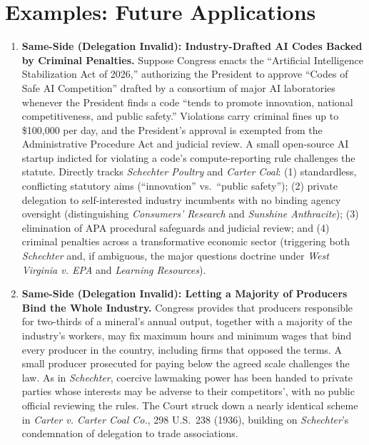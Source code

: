 \documentclass[12pt]{article}
\begin{document}
\section{Examples: Future Applications}
\begin{enumerate}

\item \textbf{Same-Side (Delegation Invalid): Industry-Drafted AI Codes Backed by Criminal Penalties.} Suppose Congress enacts the ``Artificial Intelligence Stabilization Act of 2026,'' authorizing the President to approve ``Codes of Safe AI Competition'' drafted by a consortium of major AI laboratories whenever the President finds a code ``tends to promote innovation, national competitiveness, and public safety.'' Violations carry criminal fines up to \$100,000 per day, and the President's approval is exempted from the Administrative Procedure Act and judicial review. A small open-source AI startup indicted for violating a code's compute-reporting rule challenges the statute. Directly tracks \textit{Schechter Poultry} and \textit{Carter Coal}: (1) standardless, conflicting statutory aims (``innovation'' vs.\ ``public safety''); (2) private delegation to self-interested industry incumbents with no binding agency oversight (distinguishing \textit{Consumers' Research} and \textit{Sunshine Anthracite}); (3) elimination of APA procedural safeguards and judicial review; and (4) criminal penalties across a transformative economic sector (triggering both \textit{Schechter} and, if ambiguous, the major questions doctrine under \textit{West Virginia v. EPA} and \textit{Learning Resources}).

\item \textbf{Same-Side (Delegation Invalid): Letting a Majority of Producers Bind the Whole Industry.} Congress provides that producers responsible for two-thirds of a mineral's annual output, together with a majority of the industry's workers, may fix maximum hours and minimum wages that bind every producer in the country, including firms that opposed the terms. A small producer prosecuted for paying below the agreed scale challenges the law. As in \textit{Schechter}, coercive lawmaking power has been handed to private parties whose interests may be adverse to their competitors', with no public official reviewing the rules. The Court struck down a nearly identical scheme in \textit{Carter v. Carter Coal Co.}, 298 U.S.\ 238 (1936), building on \textit{Schechter}'s condemnation of delegation to trade associations.


\end{enumerate}
\end{document}
